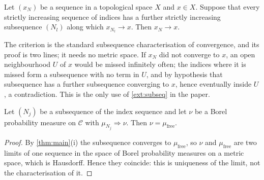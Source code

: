 \begin{external}\label{ext:subseq}
Let $(x_N)$ be a sequence in a topological space $X$ and $x\in X$. Suppose that
every strictly increasing sequence of indices has a further strictly increasing
subsequence $(N_l)$ along which $x_{N_l}\to x$. Then $x_N\to x$.
\end{external}

The criterion is the standard subsequence characterisation of convergence, and
its proof is two lines; it needs no metric space. If $x_N$ did not converge to
$x$, an open neighbourhood $U$ of $x$ would be missed infinitely often; the
indices where it is missed form a subsequence with no term in $U$, and by
hypothesis that subsequence has a further subsequence converging to $x$, hence
eventually inside $U$, a contradiction. This is the only use of
\cref{ext:subseq} in the paper.

\begin{corollary}[Uniqueness]\label{cor:uniqueness}
Let $(N_j)$ be a subsequence of the index sequence and let $\nu$ be a Borel
probability measure on $\mathcal C$ with $\mu_{N_j}\Rightarrow\nu$. Then
$\nu=\mu_{\mathrm{free}}$.
\end{corollary}

\begin{proof}
By \cref{thm:main}(i) the subsequence converges to $\mu_{\mathrm{free}}$, so
$\nu$ and $\mu_{\mathrm{free}}$ are two limits of one sequence in the space of
Borel probability measures on a metric space, which is Hausdorff. Hence they
coincide: this is uniqueness of the limit, not the characterisation of it.
\end{proof}

